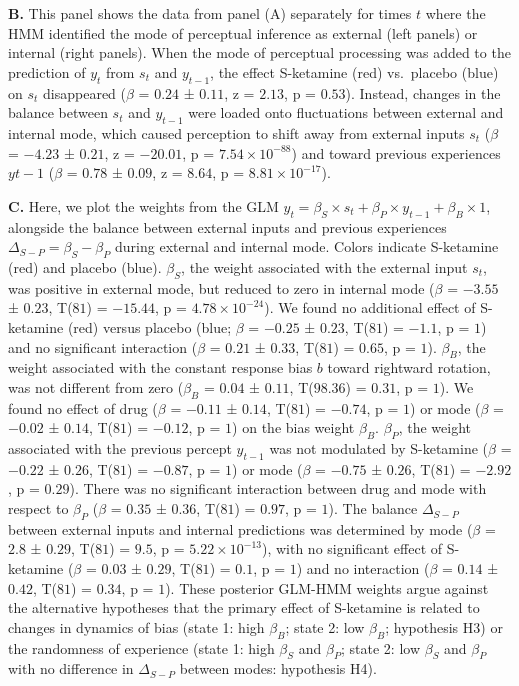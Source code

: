 \documentclass[
]{article}
\begin{document}
\textbf{B.} This panel shows the data from panel (A) separately for
times \(t\) where the HMM identified the mode of perceptual inference as
external (left panels) or internal (right panels). When the mode of
perceptual processing was added to the prediction of \(y_t\) from
\(s_t\) and \(y_{t-1}\), the effect S-ketamine (red) vs.~placebo (blue)
on \(s_t\) disappeared (\(\beta\) = \(0.24\) ± \(0.11\), z = \(2.13\), p
= \(0.53\)). Instead, changes in the balance between \(s_t\) and
\(y_{t-1}\) were loaded onto fluctuations between external and internal
mode, which caused perception to shift away from external inputs \(s_t\)
(\(\beta\) = \(-4.23\) ± \(0.21\), z = \(-20.01\), p =
\(\ensuremath{7.54\times 10^{-88}}\)) and toward previous experiences
\(y{t-1}\) (\(\beta\) = \(0.78\) ± \(0.09\), z = \(8.64\), p =
\(\ensuremath{8.81\times 10^{-17}}\)).

\textbf{C.} Here, we plot the weights from the GLM
\(y_t = \beta_S \times s_t + \beta_P \times y_{t-1} + \beta_B \times 1\),
alongside the balance between external inputs and previous experiences
\(\Delta_{S-P} = \beta_S - \beta_P\) during external and internal mode.
Colors indicate S-ketamine (red) and placebo (blue). \(\beta_S\), the
weight associated with the external input \(s_t\), was positive in
external mode, but reduced to zero in internal mode (\(\beta\) =
\(-3.55\) ± \(0.23\), T(\(81\)) = \(-15.44\), p =
\(\ensuremath{4.78\times 10^{-24}}\)). We found no additional effect of
S-ketamine (red) versus placebo (blue; \(\beta\) = \(-0.25\) ± \(0.23\),
T(\(81\)) = \(-1.1\), p = \(1\)) and no significant interaction
(\(\beta\) = \(0.21\) ± \(0.33\), T(\(81\)) = \(0.65\), p = \(1\)).
\(\beta_B\), the weight associated with the constant response bias \(b\)
toward rightward rotation, was not different from zero (\(\beta_B\) =
\(0.04\) ± \(0.11\), T(\(98.36\)) = \(0.31\), p = \(1\)). We found no
effect of drug (\(\beta\) = \(-0.11\) ± \(0.14\), T(\(81\)) = \(-0.74\),
p = \(1\)) or mode (\(\beta\) = \(-0.02\) ± \(0.14\), T(\(81\)) =
\(-0.12\), p = \(1\)) on the bias weight \(\beta_B\). \(\beta_P\), the
weight associated with the previous percept \(y_{t-1}\) was not
modulated by S-ketamine (\(\beta\) = \(-0.22\) ± \(0.26\), T(\(81\)) =
\(-0.87\), p = \(1\)) or mode (\(\beta\) = \(-0.75\) ± \(0.26\),
T(\(81\)) = \(-2.92\), p = \(0.29\)). There was no significant
interaction between drug and mode with respect to \(\beta_P\) (\(\beta\)
= \(0.35\) ± \(0.36\), T(\(81\)) = \(0.97\), p = \(1\)). The balance
\(\Delta_{S-P}\) between external inputs and internal predictions was
determined by mode (\(\beta\) = \(2.8\) ± \(0.29\), T(\(81\)) = \(9.5\),
p = \(\ensuremath{5.22\times 10^{-13}}\)), with no significant effect of
S-ketamine (\(\beta\) = \(0.03\) ± \(0.29\), T(\(81\)) = \(0.1\), p =
\(1\)) and no interaction (\(\beta\) = \(0.14\) ± \(0.42\), T(\(81\)) =
\(0.34\), p = \(1\)). These posterior GLM-HMM weights argue against the
alternative hypotheses that the primary effect of S-ketamine is related
to changes in dynamics of bias (state 1: high \(\beta_B\); state 2: low
\(\beta_B\); hypothesis H3) or the randomness of experience (state 1:
high \(\beta_S\) and \(\beta_P\); state 2: low \(\beta_S\) and
\(\beta_P\) with no difference in \(\Delta_{S-P}\) between modes:
hypothesis H4).
\end{document}
